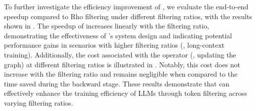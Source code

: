 To further investigate the efficiency improvement of \solution, we evaluate the end-to-end speedup compared to Rho filtering under different filtering ratios, with the results shown in . The speedup of \solution increases linearly with the filtering ratio, demonstrating the effectiveness of \solution's system design and indicating potential performance gains in scenarios with higher filtering ratios (\eg, long-context training).
Additionally, the cost associated with the \solution operator (\ie, updating the graph) at different filtering ratios is illustrated in . Notably, this cost does not increase with the filtering ratio and remains negligible when compared to the time saved during the backward stage. These results demonstrate that \solution can effectively enhance the training efficiency of LLMs through token filtering across varying filtering ratios.